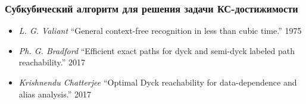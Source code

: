 \documentclass[xcolor=table]{beamer}
\begin{document}
\begin{frame}[fragile] \frametitle{Субкубический алгоритм для решения задачи КС-достижимости}

  \begin{itemize}
      \item \emph{L. G. Valiant} ``General context-free recognition in less than cubic time.'' 1975
      \item \emph{Ph. G. Bradford} ``Efficient exact paths for dyck and semi-dyck labeled path reachability.'' 2017
      \item \emph{Krishnendu Chatterjee} ``Optimal Dyck reachability for data-dependence and alias analysis.'' 2017
  \end{itemize}

\end{frame}
\end{document}
